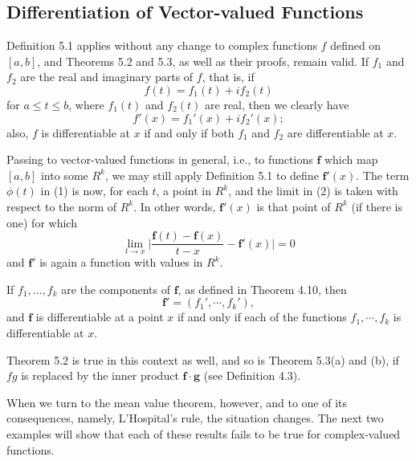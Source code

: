 \documentclass[../poma-notes.tex]{subfiles}
\begin{document}
\subsection*{Differentiation of Vector-valued Functions}

\begin{remarks}
  Definition 5.1 applies without any change to complex functions $f$ defined on $[a,b]$, and Theorems 5.2 and 5.3,
  as well as their proofs, remain valid. If $f_1$ and $f_2$ are the real and imaginary parts of $f$, that is, if
  \[
    f(t) = f_1(t) + i f_2(t)
  \]
  for $a \le t \le b$, where $f_1(t)$ and $f_2(t)$ are real, then we clearly have
  \begin{equation}
    f'(x) = f_1'(x) + i f_2'(x);
  \end{equation}
  also, $f$ is differentiable at $x$ if and only if both $f_1$ and $f_2$ are differentiable at $x$.

  Passing to vector-valued functions in general, i.e., to functions $\mathbf{f}$ which map $[a,b]$ into some $R^k$,
  we may still apply Definition 5.1 to define $\mathbf{f}'(x)$. The term $\phi(t)$ in (1) is now, for each $t$,
  a point in $R^k$, and the limit in (2) is taken with respect to the norm of $R^k$. In other words, $\mathbf{f}'(x)$
  is that point of $R^k$ (if there is one) for which
  \begin{equation}
    \lim_{t\to x} \biggl| \frac{\mathbf{f}(t) - \mathbf{f}(x)}{t - x} - \mathbf{f}'(x) \biggr| = 0
  \end{equation}
  and $\mathbf{f}'$ is again a function with values in $R^k$.

  If $f_1,\dots,f_k$ are the components of $\mathbf{f}$, as defined in Theorem 4.10, then
  \begin{equation}
    \mathbf{f}' = (f_1',\cdots,f_k'),
  \end{equation}
  and $\mathbf{f}$ is differentiable at a point $x$ if and only if each of the functions $f_1,\cdots,f_k$ is
  differentiable at $x$.

  Theorem 5.2 is true in this context as well, and so is Theorem 5.3(a) and (b), if $fg$ is replaced by the inner
  product $\mathbf{f \cdot g}$ (see Definition 4.3).

  When we turn to the mean value theorem, however, and to one of its consequences, namely, L'Hospital's rule,
  the situation changes. The next two examples will show that each of these results fails to be true for
  complex-valued functions.
\end{remarks}

\end{document}
